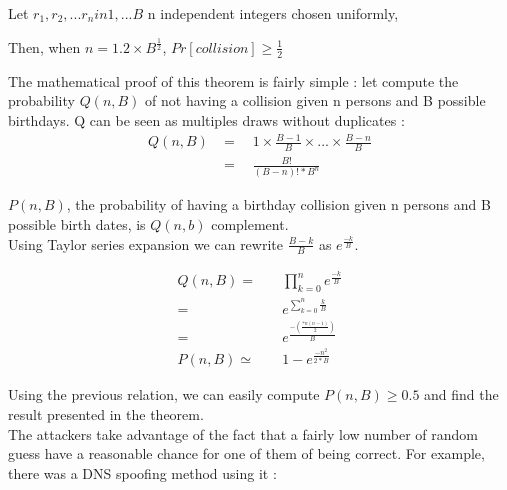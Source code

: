 \begin{mytheorem}
Let $r_1,r_2,...r_n in {1,...B}$ n independent integers chosen uniformly, 
\begin{flushright}
Then, when $n = 1.2\times B^{\frac{1}{2}}$, $Pr[collision] \geq \frac{1}{2} $
\end{flushright}
\end{mytheorem}

The mathematical proof of this theorem is fairly simple : let compute the probability $Q(n,B)$ of not having a collision given n persons and B possible birthdays. Q can be seen as multiples draws without duplicates : \\

\begin{align}
    Q(n,B)& = \quad 1 \times \frac{B-1}{B} \times ... \times \frac{B-n}{B} \\
          & =\quad \frac{B!}{(B-n)!*B^n} 
\end{align}  



$P(n,B)$, the probability of having a birthday collision given n persons and B possible birth dates, is $Q(n,b)$ complement. \\
Using Taylor series expansion we can rewrite $\frac{B-k}{B}$ as $e^{\frac{-k}{B}}$.  

\begin{align}
    Q(n,B) =& \quad \prod_{k = 0}^n e^{\frac{-k}{B}}\\
           =& \quad e^{\sum_{k = 0}^n \frac{k}{B}}        \\
           =& \quad e^{ \frac{-(\frac{*n(n-1)}{2})}{B} }\\
    P(n,B) \simeq& \quad 1 - e^{ \frac{-n^2}{2*B} }       
\end{align}  


Using the previous relation, we can easily compute $P(n,B) \geq 0.5$ and find the result presented in the theorem.\\

The attackers take advantage of the fact that a fairly low number of random guess have a reasonable chance for one of them of being correct. For example, there was a DNS spoofing method using it : \\

